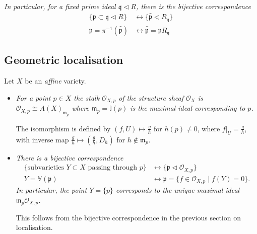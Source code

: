 \documentclass[10pt]{article}
\newcommand{\van}{\mathbb{V}}
\newcommand{\ide}{\mathbb{I}}
\newcommand{\prid}{\mathfrak{p}}
\newcommand{\maid}{\mathfrak{m}}
\begin{document}
\begin{itemize}
\begin{align*}
                    \end{align*}
                    \emph{In particular, for a fixed prime ideal $\mathfrak{q}\triangleleft R$, there is the bijective correspondence}
                    \begin{align*}
                        \{\prid\subset\mathfrak{q}\triangleleft R\} &\leftrightarrow \{\hat{\prid}\triangleleft R_\mathfrak{q}\}\\
                        \prid=\pi^{-1}(\hat{\prid}) &\leftrightarrow \hat{\prid}=\prid R_\mathfrak{q}
                    \end{align*}
            \end{itemize}

        \subsection{Geometric localisation}

            Let $X$ be an \emph{affine} variety.

            \begin{itemize}
                \item \emph{For a point $p\in X$ the stalk $\mathcal{O}_{X,p}$ of the structure sheaf $\mathcal{O}_X$ is $\mathcal{O}_{X,p}\cong A(X)_{\maid_p}$ where $\maid_p=\ide(p)$ is the maximal ideal corresponding to $p$.}

                    The isomorphism is defined by $(f,U)\mapsto\frac{g}{h}$ for $h(p)\neq0$, where $f|_U=\frac{g}{h}$, with inverse map $\frac{g}{h}\mapsto(\frac{g}{h},D_h)$ for $h\not\in\maid_p$.

                \item \emph{There is a bijective correspondence}
                    \begin{align*}
                        \{\text{subvarieties $Y\subset X$ passing through $p$}\} &\leftrightarrow \{\prid\triangleleft\mathcal{O}_{X,p}\}\\
                        Y=\van(\prid) &\leftrightarrow \prid=\{f\in\mathcal{O}_{X,p}\mid f(Y)=0\}.
                    \end{align*}
                    \emph{In particular, the point $Y=\{p\}$ corresponds to the \emph{unique} maximal ideal $\maid_p\mathcal{O}_{X,p}$.}

                    This follows from the bijective correspondence in the previous section on localisation.
            \end{itemize}
\end{document}
